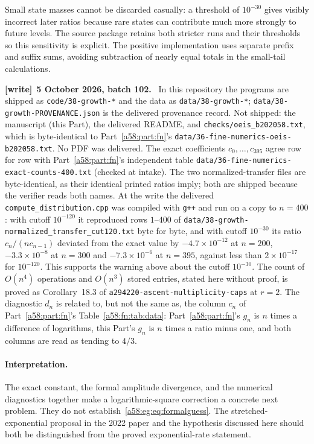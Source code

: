\documentclass[11pt,letterpaper]{article}
\newcommand{\file}[1]{\nolinkurl{#1}}
\theoremstyle{remark}
\newenvironment{writenote}[1][]{\par\smallskip\begingroup\small
 \noindent\textbf{[write]}\if\relax\detokenize{#1}\relax\else~\textbf{#1.}\fi\ }%
 {\par\endgroup\smallskip}
\begin{document}
Small state masses cannot be discarded casually: a threshold of $10^{-30}$ gives visibly incorrect later ratios because rare states can contribute much more strongly to future levels. The source package retains both stricter runs and their thresholds so this sensitivity is explicit. The positive implementation uses separate prefix and suffix sums, avoiding subtraction of nearly equal totals in the small-tail calculations.

\begin{writenote}[5 October 2026, batch 102]
In this repository the programs are shipped as \file{code/38-growth-*} and the data as \file{data/38-growth-*}; \file{data/38-growth-PROVENANCE.json} is the delivered provenance record. Not shipped: the manuscript (this Part), the delivered README, and \file{checks/oeis_b202058.txt}, which is byte-identical to Part~\ref{a58:part:fn}'s \file{data/36-fine-numerics-oeis-b202058.txt}. No PDF was delivered. The exact coefficients $c_0,\ldots,c_{395}$ agree row for row with Part~\ref{a58:part:fn}'s independent table \file{data/36-fine-numerics-exact-counts-400.txt} (checked at intake). The two normalized-transfer files are byte-identical, as their identical printed ratios imply; both are shipped because the verifier reads both names. At the write the delivered \file{compute_distribution.cpp} was compiled with \texttt{g++} and run on a copy to $n=400$: with cutoff $10^{-120}$ it reproduced rows $1$--$400$ of \file{data/38-growth-normalized_transfer_cut120.txt} byte for byte, and with cutoff $10^{-30}$ its ratio $c_n/(nc_{n-1})$ deviated from the exact value by $-4.7\times10^{-12}$ at $n=200$, $-3.3\times10^{-8}$ at $n=300$ and $-7.3\times10^{-6}$ at $n=395$, against less than $2\times10^{-17}$ for $10^{-120}$. This supports the warning above about the cutoff $10^{-30}$. The count of $O(n^4)$ operations and $O(n^3)$ stored entries, stated here without proof, is proved as Corollary~18.3 of \file{a294220-ascent-multiplicity-caps} at $r=2$. The diagnostic $d_n$ is related to, but not the same as, the column $c_n$ of Part~\ref{a58:part:fn}'s Table~\ref{a58:fn:tab:data}: Part~\ref{a58:part:fn}'s $g_n$ is $n$ times a difference of logarithms, this Part's $g_n$ is $n$ times a ratio minus one, and both columns are read as tending to $4/3$.
\end{writenote}

\paragraph{Interpretation.}
The exact constant, the formal amplitude divergence, and the numerical diagnostics together make a logarithmic-square correction a concrete next problem. They do not establish~\eqref{a58:eg:eq:formalguess}. The stretched-exponential proposal in the 2022 paper and the hypothesis discussed here should both be distinguished from the proved exponential-rate statement.
\end{document}
